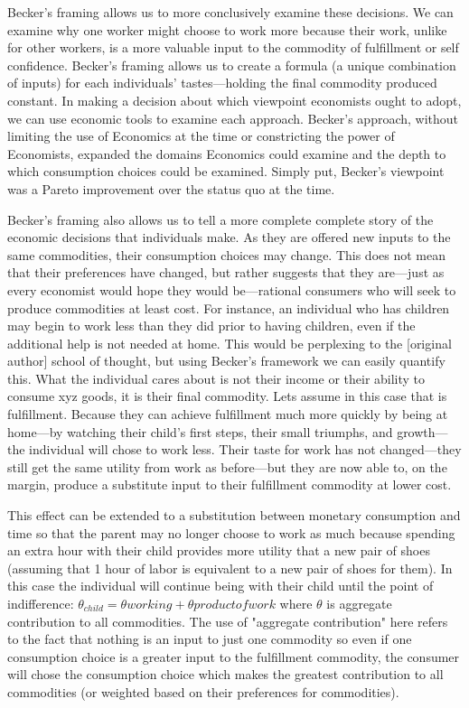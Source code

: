 \documentclass{article}
\begin{document}
Becker’s framing allows us to more conclusively examine these decisions. We can examine why one worker might choose to work more because their work, unlike for other workers, is a more valuable input to the commodity of fulfillment or self confidence. Becker’s framing allows us to create a formula (a unique combination of inputs) for each individuals' tastes—holding the final commodity produced constant. In making a decision about which viewpoint economists ought to adopt, we can use economic tools to examine each approach. Becker’s approach, without limiting the use of Economics at the time or constricting the power of Economists, expanded the domains Economics could examine and the depth to which consumption choices could be examined. Simply put, Becker’s viewpoint was a Pareto improvement over the status quo at the time. 

Becker’s framing also allows us to tell a more complete complete story of the economic decisions that individuals make. As they are offered new inputs to the same commodities, their consumption choices may change. This does not mean that their preferences have changed, but rather suggests that they are—just as every economist would hope they would be—rational consumers who will seek to produce commodities at least cost. For instance, an individual who has children may begin to work less than they did prior to having children, even if the additional help is not needed at home. This would be perplexing to the [original author] school of thought, but using Becker’s framework we can easily quantify this. What the individual cares about is not their income or their ability to consume xyz goods, it is their final commodity. Lets assume in this case that is fulfillment. Because they can achieve fulfillment much more quickly by being at home—by watching their child’s first steps, their small triumphs, and growth—the individual will chose to work less. Their taste for work has not changed—they still get the same utility from work as before—but they are now able to, on the margin, produce a substitute input to their fulfillment commodity at lower cost.

This effect can be extended to a substitution between monetary consumption and time so that the parent may no longer choose to work as much because spending an extra hour with their child provides more utility that a new pair of shoes (assuming that 1 hour of labor is equivalent to a new pair of shoes for them). In this case the individual will continue being with their child  until the point of indifference: $\theta_{child} = \theta{working} + \theta{product of work}$ where $\theta$ is aggregate contribution to all commodities. The use of "aggregate contribution" here refers to the fact that nothing is an input to just one commodity so even if one consumption choice is a greater input to the fulfillment commodity, the consumer will chose the consumption choice which makes the greatest contribution to all commodities (or weighted based on their preferences for commodities).  
\end{document}
